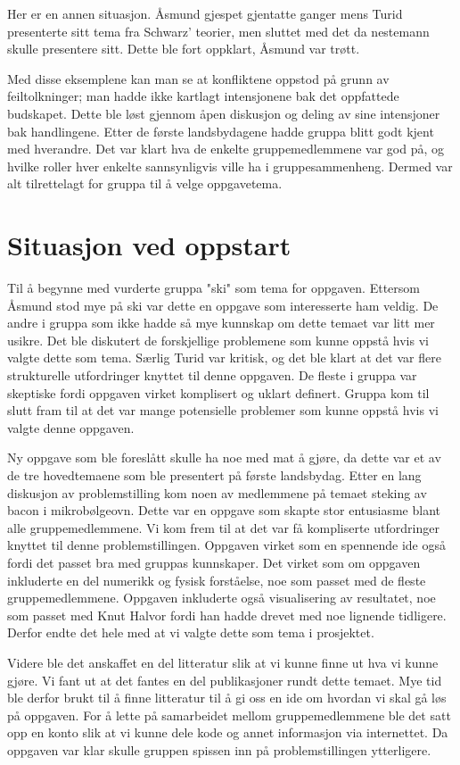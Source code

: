 Her er en annen situasjon. Åsmund gjespet gjentatte ganger mens Turid
presenterte sitt tema fra Schwarz’ teorier, men sluttet med det da nestemann
skulle presentere sitt.  Dette ble fort oppklart, Åsmund var trøtt.

Med disse eksemplene kan man se at konfliktene oppstod på grunn av
feiltolkninger; man hadde ikke kartlagt intensjonene bak det oppfattede
budskapet. Dette ble løst gjennom åpen diskusjon og deling av sine intensjoner
bak handlingene.  Etter de første landsbydagene hadde gruppa blitt godt kjent
med hverandre. Det var klart hva de enkelte gruppemedlemmene var god på, og
hvilke roller hver enkelte sannsynligvis ville ha i gruppesammenheng. Dermed var
alt tilrettelagt for gruppa til å velge oppgavetema.

\section{Situasjon ved oppstart}
Til å begynne med vurderte gruppa "ski" som tema for oppgaven. Ettersom Åsmund
stod mye på ski var dette en oppgave som interesserte ham veldig. De andre i
gruppa som ikke hadde så mye kunnskap om dette temaet var litt mer usikre. Det
ble diskutert de forskjellige problemene som kunne oppstå hvis vi valgte dette
som tema. Særlig Turid var kritisk, og det ble klart at det var flere
strukturelle utfordringer knyttet til denne oppgaven. De fleste i gruppa var
skeptiske fordi oppgaven virket komplisert og uklart definert. Gruppa kom til
slutt fram til at det var mange potensielle problemer som kunne oppstå hvis vi
valgte denne oppgaven.

Ny oppgave som ble foreslått skulle ha noe med mat å gjøre, da dette var et av
de tre hovedtemaene som ble presentert på første landsbydag. Etter en lang
diskusjon av problemstilling kom noen av medlemmene på temaet steking av bacon i
mikrobølgeovn. Dette var en oppgave som skapte stor entusiasme blant alle
gruppemedlemmene. Vi kom frem til at det var få kompliserte utfordringer knyttet
til denne problemstillingen. Oppgaven virket som en spennende ide også fordi det
passet bra med gruppas kunnskaper. Det virket som om oppgaven inkluderte en del
numerikk og fysisk forståelse, noe som passet med de fleste gruppemedlemmene.
Oppgaven inkluderte også visualisering av resultatet, noe som passet med Knut
Halvor fordi han hadde drevet med noe lignende tidligere. Derfor endte det hele
med at vi valgte dette som tema i prosjektet.

Videre ble det anskaffet en del litteratur slik at vi kunne finne ut hva vi
kunne gjøre. Vi fant ut at det fantes en del publikasjoner rundt dette temaet.
Mye tid ble derfor brukt til å finne litteratur til å gi oss en ide om hvordan
vi skal gå løs på oppgaven. For å lette på samarbeidet mellom gruppemedlemmene
ble det satt opp en konto slik at vi kunne dele kode og annet informasjon via
internettet. Da oppgaven var klar skulle gruppen spissen inn på
problemstillingen ytterligere.

